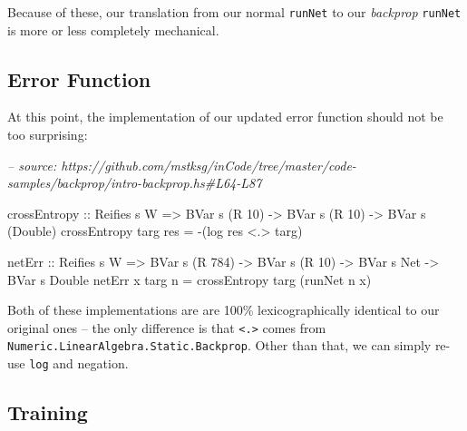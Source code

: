 \documentclass[]{article}
\newenvironment{Shaded}{}{}
\newcommand{\CommentTok}[1]{\textcolor[rgb]{0.38,0.63,0.69}{\textit{#1}}}
\newcommand{\DataTypeTok}[1]{\textcolor[rgb]{0.56,0.13,0.00}{#1}}
\newcommand{\DecValTok}[1]{\textcolor[rgb]{0.25,0.63,0.44}{#1}}
\newcommand{\FunctionTok}[1]{\textcolor[rgb]{0.02,0.16,0.49}{#1}}
\newcommand{\NormalTok}[1]{#1}
\newcommand{\OtherTok}[1]{\textcolor[rgb]{0.00,0.44,0.13}{#1}}
\begin{document}
Because of these, our translation from our normal \texttt{runNet} to our
\emph{backprop} \texttt{runNet} is more or less completely mechanical.

\hypertarget{error-function-1}{%
\subsection{Error Function}\label{error-function-1}}

At this point, the implementation of our updated error function should not be
too surprising:

\begin{Shaded}
\begin{Highlighting}[]
\CommentTok{-- source: https://github.com/mstksg/inCode/tree/master/code-samples/backprop/intro-backprop.hs#L64-L87}

\NormalTok{crossEntropy}
\OtherTok{    ::} \DataTypeTok{Reifies}\NormalTok{ s }\DataTypeTok{W}
    \OtherTok{=>} \DataTypeTok{BVar}\NormalTok{ s (}\DataTypeTok{R} \DecValTok{10}\NormalTok{)}
    \OtherTok{->} \DataTypeTok{BVar}\NormalTok{ s (}\DataTypeTok{R} \DecValTok{10}\NormalTok{)}
    \OtherTok{->} \DataTypeTok{BVar}\NormalTok{ s (}\DataTypeTok{Double}\NormalTok{)}
\NormalTok{crossEntropy targ res }\FunctionTok{=} \FunctionTok{-}\NormalTok{(log res }\FunctionTok{<.>}\NormalTok{ targ)}

\NormalTok{netErr}
\OtherTok{    ::} \DataTypeTok{Reifies}\NormalTok{ s }\DataTypeTok{W}
    \OtherTok{=>} \DataTypeTok{BVar}\NormalTok{ s (}\DataTypeTok{R} \DecValTok{784}\NormalTok{)}
    \OtherTok{->} \DataTypeTok{BVar}\NormalTok{ s (}\DataTypeTok{R} \DecValTok{10}\NormalTok{)}
    \OtherTok{->} \DataTypeTok{BVar}\NormalTok{ s }\DataTypeTok{Net}
    \OtherTok{->} \DataTypeTok{BVar}\NormalTok{ s }\DataTypeTok{Double}
\NormalTok{netErr x targ n }\FunctionTok{=}\NormalTok{ crossEntropy targ (runNet n x)}
\end{Highlighting}
\end{Shaded}

Both of these implementations are are 100\% lexicographically identical to our
original ones -- the only difference is that \texttt{\textless{}.\textgreater{}}
comes from \texttt{Numeric.LinearAlgebra.Static.Backprop}. Other than that, we
can simply re-use \texttt{log} and negation.

\hypertarget{training-1}{%
\subsection{Training}\label{training-1}}
\end{document}
